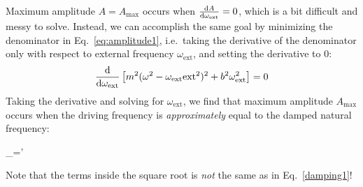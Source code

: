 Maximum amplitude $A=A_\text{max}$ occurs when $\diff A{\omega_\text{ext}}=0$,
which is a bit difficult and messy to solve. Instead, we can accomplish the
same goal by minimizing the  denominator in Eq.~\ref{eq:amplitude1}, i.e.\
taking the derivative of the denominator only with respect to external
frequency $\omega_\text{ext}$, and setting the derivative to 0:
\begin{equation*}
  \diff{}{\omega_\text{ext}}
  \left[m^2(\omega^2-\omega_\text{ext}\text{ext}^2)^2+b^2\omega_\text{ext}^2\right]
  =0
\end{equation*}
Taking the derivative and solving for $\omega_\text{ext}$, we find that maximum
amplitude $A_\text{max}$ occurs when the driving frequency is
\emph{approximately} equal to the damped natural frequency:
\begin{important-equation}
  \omega_=\approx\omega'
\end{important-equation}
Note that the terms inside the square root is \emph{not} the same as in
Eq.~\ref{damping1}!

